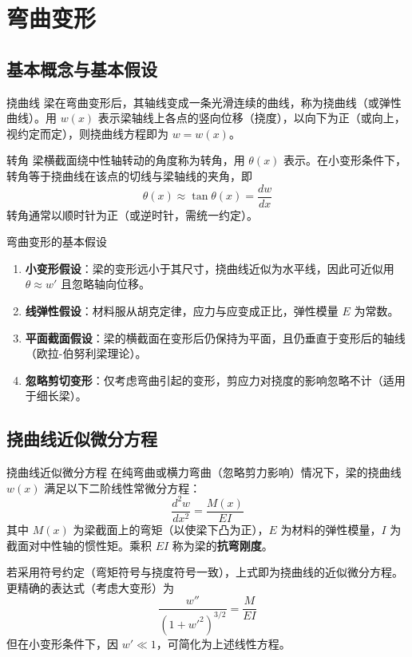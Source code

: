 \chapter{弯曲变形}

\section{基本概念与基本假设}

\begin{mydefinition}{挠曲线}
    梁在弯曲变形后，其轴线变成一条光滑连续的曲线，称为挠曲线（或弹性曲线）。用 \(w(x)\) 表示梁轴线上各点的竖向位移（挠度），以向下为正（或向上，视约定而定），则挠曲线方程即为 \(w = w(x)\)。
\end{mydefinition}

\begin{mydefinition}{转角}
    梁横截面绕中性轴转动的角度称为转角，用 \(\theta(x)\) 表示。在小变形条件下，转角等于挠曲线在该点的切线与梁轴线的夹角，即
    \[
    \theta(x) \approx \tan\theta(x) = \frac{dw}{dx}
    \]
    转角通常以顺时针为正（或逆时针，需统一约定）。
\end{mydefinition}

\begin{myhypothesis}{弯曲变形的基本假设}
    \begin{enumerate}
        \item \textbf{小变形假设}：梁的变形远小于其尺寸，挠曲线近似为水平线，因此可近似用 \(\theta \approx w'\) 且忽略轴向位移。
        \item \textbf{线弹性假设}：材料服从胡克定律，应力与应变成正比，弹性模量 \(E\) 为常数。
        \item \textbf{平面截面假设}：梁的横截面在变形后仍保持为平面，且仍垂直于变形后的轴线（欧拉-伯努利梁理论）。
        \item \textbf{忽略剪切变形}：仅考虑弯曲引起的变形，剪应力对挠度的影响忽略不计（适用于细长梁）。
    \end{enumerate}
\end{myhypothesis}

\section{挠曲线近似微分方程}

\begin{myTheorem}{挠曲线近似微分方程}
    在纯弯曲或横力弯曲（忽略剪力影响）情况下，梁的挠曲线 \(w(x)\) 满足以下二阶线性常微分方程：
    \[
    \frac{d^2 w}{dx^2} = \frac{M(x)}{E I}
    \]
    其中 \(M(x)\) 为梁截面上的弯矩（以使梁下凸为正），\(E\) 为材料的弹性模量，\(I\) 为截面对中性轴的惯性矩。乘积 \(EI\) 称为梁的\textbf{抗弯刚度}。

    若采用符号约定（弯矩符号与挠度符号一致），上式即为挠曲线的近似微分方程。更精确的表达式（考虑大变形）为
    \[
    \frac{w''}{(1+w'^2)^{3/2}} = \frac{M}{EI}
    \]
    但在小变形条件下，因 \(w' \ll 1\)，可简化为上述线性方程。
\end{myTheorem}

